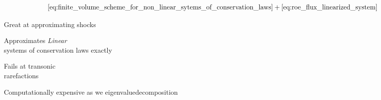 \begin{defnbox}\nospacing
    \begin{defn}\label{defn:roe_scheme}
        \begin{align}
          \Cref{eq:finite_volume_scheme_for_non_linear_sytems_of_conservation_laws}+\Cref{eq:roe_flux_linearized_system}
        \end{align}
    \end{defn}
\end{defnbox}
\begin{sectionbox}\nospacing
    \begin{minipage}[t]{0.45\textwidth}
        \begin{proslist}
            \item Great at approximating shocks
            \item Approximates \textit{Linear}\\ systems of conservation laws exactly
        \end{proslist}
    \end{minipage}
    \begin{minipage}[t]{0.45\textwidth}
        \begin{conslist}
            \item Fails at transonic\\ rarefactions
            \item Computationally expensive as we eigenvaluedecomposition
        \end{conslist}
    \end{minipage}
\end{sectionbox}



